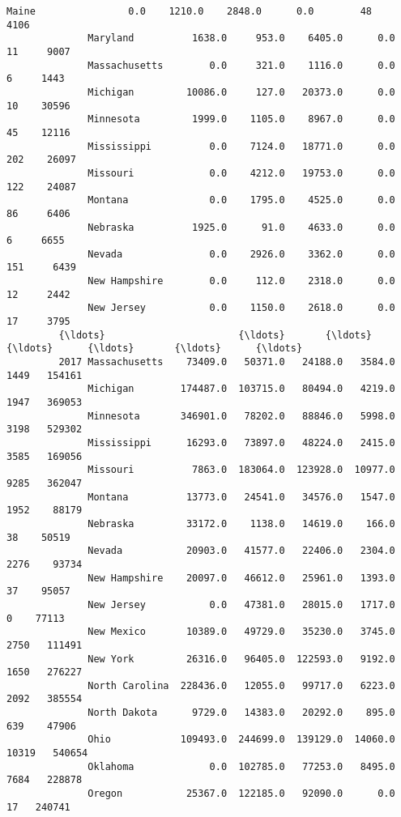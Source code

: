 \documentclass[11pt]{article}
\begin{document}
\begin{Verbatim}[commandchars=\\\{\}]
              Maine                0.0    1210.0    2848.0      0.0        48     4106
              Maryland          1638.0     953.0    6405.0      0.0        11     9007
              Massachusetts        0.0     321.0    1116.0      0.0         6     1443
              Michigan         10086.0     127.0   20373.0      0.0        10    30596
              Minnesota         1999.0    1105.0    8967.0      0.0        45    12116
              Mississippi          0.0    7124.0   18771.0      0.0       202    26097
              Missouri             0.0    4212.0   19753.0      0.0       122    24087
              Montana              0.0    1795.0    4525.0      0.0        86     6406
              Nebraska          1925.0      91.0    4633.0      0.0         6     6655
              Nevada               0.0    2926.0    3362.0      0.0       151     6439
              New Hampshire        0.0     112.0    2318.0      0.0        12     2442
              New Jersey           0.0    1150.0    2618.0      0.0        17     3795
         {\ldots}                       {\ldots}       {\ldots}       {\ldots}      {\ldots}       {\ldots}      {\ldots}
         2017 Massachusetts    73409.0   50371.0   24188.0   3584.0      1449   154161
              Michigan        174487.0  103715.0   80494.0   4219.0      1947   369053
              Minnesota       346901.0   78202.0   88846.0   5998.0      3198   529302
              Mississippi      16293.0   73897.0   48224.0   2415.0      3585   169056
              Missouri          7863.0  183064.0  123928.0  10977.0      9285   362047
              Montana          13773.0   24541.0   34576.0   1547.0      1952    88179
              Nebraska         33172.0    1138.0   14619.0    166.0        38    50519
              Nevada           20903.0   41577.0   22406.0   2304.0      2276    93734
              New Hampshire    20097.0   46612.0   25961.0   1393.0        37    95057
              New Jersey           0.0   47381.0   28015.0   1717.0         0    77113
              New Mexico       10389.0   49729.0   35230.0   3745.0      2750   111491
              New York         26316.0   96405.0  122593.0   9192.0      1650   276227
              North Carolina  228436.0   12055.0   99717.0   6223.0      2092   385554
              North Dakota      9729.0   14383.0   20292.0    895.0       639    47906
              Ohio            109493.0  244699.0  139129.0  14060.0     10319   540654
              Oklahoma             0.0  102785.0   77253.0   8495.0      7684   228878
              Oregon           25367.0  122185.0   92090.0      0.0        17   240741

\end{Verbatim}
\end{document}
